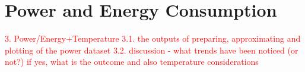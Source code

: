 \section{Power and Energy Consumption}
\noindent

\textcolor{red}{3. Power/Energy+Temperature
3.1. the outputs of preparing, approximating and plotting of the power dataset
3.2. discussion - what trends have been noticed (or not?) if yes, what is the outcome and also temperature considerations}
